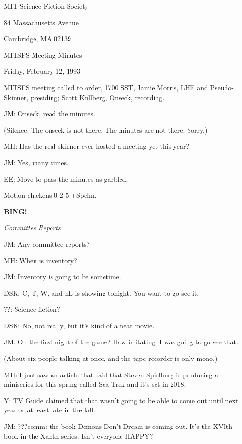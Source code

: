 \documentclass[12pt]{article}
\newcommand{\bing}{{\bf BING!} }
\newcommand{\goto}[1]{\bing \vskip 12pt \centerline{{\em{#1}}}}
\begin{document}
\begin{center}

MIT Science Fiction Society 

84 Massachusetts Avenue

Cambridge, MA 02139

\vspace{12pt}

MITSFS Meeting Minutes 

Friday, February 12, 1993

\end{center}
 
\vspace{18pt}

\setlength{\parskip}{6pt}

\noindent
MITSFS meeting called to order, 1700 SST,
Jamie Morris, LHE and Pseudo-Skinner, presiding; Scott Kullberg, Onseck, recording.

JM: Onseck, read the minutes.

(Silence. The onseck is not there. The minutes are not there. Sorry.)

MH: Has the real skinner ever hosted a meeting yet this year?

JM: Yes, many times.

EE: Move to pass the minutes as garbled.

Motion chickens 0-2-5 +Spehn.

\goto{Committee Reports}

JM: Any committee reports?

MH: When is inventory?

JM: Inventory is going to be sometime.

DSK: C, T, W, and hL is showing tonight. You want to go see it.

??: Science fiction?

DSK: No, not really, but it's kind of a neat movie.

JM: On the first night of the game? How irritating. I was going to go see that.

(About six people talking at once, and the tape recorder is only mono.)

MH: I just saw an article that said that Steven Spielberg is producing a miniseries for this spring called Sea Trek and it's set in 2018.

Y: TV Guide claimed that that wasn't going to be able to come out until next year or at least late in the fall.

JM: ???comm: the book Demons Don't Dream is coming out. It's the XVIth book in the Xanth series. Isn't everyone HAPPY?
\end{document}
